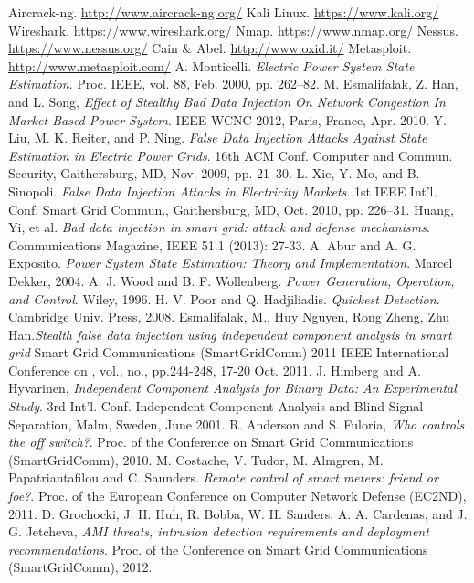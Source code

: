 \documentclass[11pt,oneside]{book}
\begin{document}
\begin{thebibliography}{99}
 Aircrack-ng. \url{http://www.aircrack-ng.org/}
 Kali Linux. \url{https://www.kali.org/}
 Wireshark. \url{https://www.wireshark.org/}
 Nmap. \url{https://www.nmap.org/}
 Nessus. \url{https://www.nessus.org/}
 Cain \& Abel. \url{http://www.oxid.it/}
 Metasploit. \url{http://www.metasploit.com/}
 A. Monticelli. \emph{Electric Power System State Estimation}. Proc. IEEE, vol. 88, Feb. 2000, pp. 262–82.
 M. Esmalifalak, Z. Han, and L. Song, \emph{Effect of Stealthy Bad Data Injection On Network Congestion In Market Based Power System}. IEEE WCNC 2012, Paris, France, Apr. 2010.
 Y. Liu, M. K. Reiter, and P. Ning. \emph{False Data Injection Attacks Against State Estimation in Electric Power Grids}. 16th ACM Conf. Computer and Commun. Security, Gaithersburg, MD, Nov. 2009, pp. 21–30.
 L. Xie, Y. Mo, and B. Sinopoli. \emph{False Data Injection Attacks in Electricity Markets}. 1st IEEE Int’l. Conf. Smart Grid Commun., Gaithersburg, MD, Oct. 2010, pp. 226–31.
 Huang, Yi, et al. \emph{Bad data injection in smart grid: attack and defense mechanisms}. Communications Magazine, IEEE 51.1 (2013): 27-33.
 A. Abur and A. G. Exposito. \emph{Power System State Estimation: Theory and Implementation}. Marcel Dekker, 2004.
 A. J. Wood and B. F. Wollenberg. \emph{Power Generation, Operation, and Control}. Wiley, 1996.
 H. V. Poor and Q. Hadjiliadis. \emph{Quickest Detection}. Cambridge Univ. Press, 2008.
 Esmalifalak, M., Huy Nguyen, Rong Zheng, Zhu Han.\emph{Stealth false data injection using independent component analysis in smart grid} Smart Grid Communications (SmartGridComm) 2011 IEEE International Conference on , vol., no., pp.244-248, 17-20 Oct. 2011.
 J. Himberg and A. Hyvarinen, \emph{Independent Component Analysis for Binary Data: An Experimental Study}. 3rd Int’l. Conf. Independent Component Analysis and Blind Signal Separation, Malm, Sweden, June 2001.
 R. Anderson and S. Fuloria, \emph{Who controls the off switch?}. Proc. of the Conference on Smart Grid Communications (SmartGridComm), 2010.
 M. Costache, V. Tudor, M. Almgren, M. Papatriantafilou and C. Saunders. \emph{Remote control of smart meters: friend or foe?}. Proc. of the European Conference on Computer Network Defense (EC2ND), 2011.
 D. Grochocki, J. H. Huh, R. Bobba, W. H. Sanders, A. A. Cardenas, and J. G. Jetcheva, \emph{AMI threats, intrusion detection requirements and deployment recommendations}. Proc. of the Conference on Smart Grid Communications (SmartGridComm), 2012.

\end{thebibliography}
\end{document}
